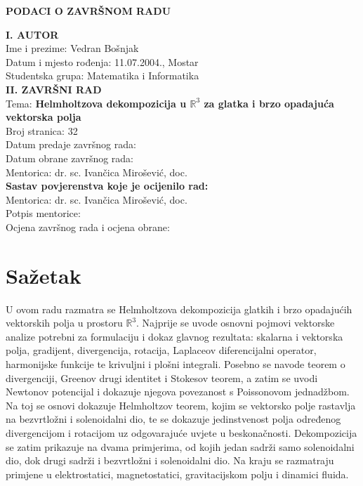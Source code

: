 \documentclass[12pt,a4paper]{article}
\begin{document}
\clearpage
\begin{center}
    \normalsize{\textbf{PODACI O ZAVRŠNOM RADU}}
\end{center}
\normalsize{\textbf{I. AUTOR}}
\vspace{0.8cm}
\\Ime i prezime: Vedran Bošnjak
\\Datum i mjesto rođenja: 11.07.2004., Mostar
\\Studentska grupa: Matematika i Informatika
\vspace{1cm}
\\ \normalsize{\textbf{II. ZAVRŠNI RAD}}
\vspace{0.8cm}
\\Tema: \textbf{Helmholtzova dekompozicija u $\mathbb{R}^3$ za glatka i brzo opadajuća vektorska polja}
\\Broj stranica: 32
\\Datum predaje završnog rada:
\\Datum obrane završnog rada:
\\Mentorica: dr. sc. Ivančica Mirošević, doc.
\vspace{1cm}
\\ \normalsize{\textbf{Sastav povjerenstva koje je ocijenilo rad:}}
\vspace{0.8cm}
\\Mentorica: dr. sc. Ivančica Mirošević, doc.
\vspace{0.5cm}
\\Potpis mentorice: \makebox[5cm]{\hrulefill}
\vspace{1cm}
\\Ocjena završnog rada i ocjena obrane: \makebox[5cm]{\hrulefill}

\clearpage
\tableofcontents
\clearpage

\section*{Sažetak}

U ovom radu razmatra se Helmholtzova dekompozicija glatkih i brzo
opadajućih vektorskih polja u prostoru $\mathbb{R}^3$. Najprije se uvode
osnovni pojmovi vektorske analize potrebni za formulaciju i dokaz glavnog
rezultata: skalarna i vektorska polja, gradijent, divergencija, rotacija,
Laplaceov diferencijalni operator, harmonijske funkcije te krivuljni i plošni integrali.
Posebno se navode teorem o divergenciji, Greenov drugi identitet i Stokesov teorem, a zatim se uvodi
Newtonov potencijal i dokazuje njegova povezanost s Poissonovom jednadžbom.
Na toj se osnovi dokazuje Helmholtzov teorem, kojim se vektorsko polje
rastavlja na bezvrtložni i solenoidalni dio, te se dokazuje jedinstvenost
polja određenog divergencijom i rotacijom uz odgovarajuće uvjete u
beskonačnosti. Dekompozicija se zatim prikazuje na dvama primjerima, od kojih
jedan sadrži samo solenoidalni dio, dok drugi sadrži i bezvrtložni i
solenoidalni dio. Na kraju se razmatraju primjene u elektrostatici,
magnetostatici, gravitacijskom polju i dinamici fluida.
\end{document}
